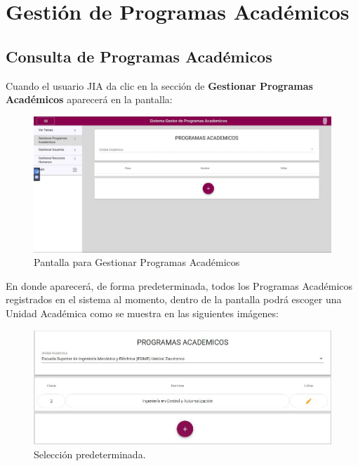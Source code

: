 \section{Gestión de Programas Académicos}
    \subsection{Consulta de Programas Académicos}
        Cuando el usuario JIA da clic en la sección de \textbf{Gestionar Programas Académicos} aparecerá en la pantalla:

        \begin{figure}[H]
        	\centering
        	\hypertarget{consultarpa}{\includegraphics[width=0.7\linewidth]{images/SP3/ConsultarPA}}
        	\caption{Pantalla para Gestionar Programas Académicos}
        	\label{consultarpa}
        \end{figure}

        En donde aparecerá, de forma predeterminada, todos los Programas Académicos  registrados en el sistema al momento, dentro de la pantalla podrá escoger una Unidad Académica  como se muestra  en las siguientes imágenes:

         \begin{figure}[H]
                \centering
                \hypertarget{prede}{\includegraphics[width=0.7\linewidth]{images/SP3/Predeterminado}}
                \caption{Selección predeterminada.}
                \label{prede}
            \end{figure}

